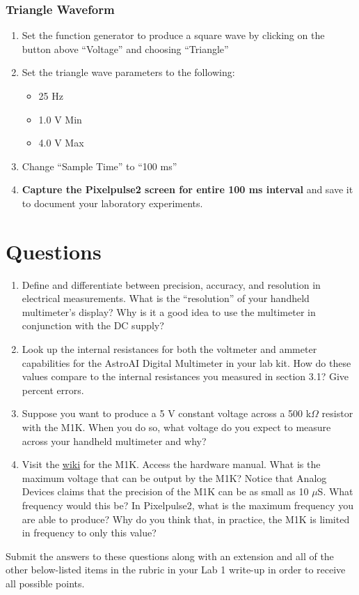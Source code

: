 \documentclass[12pt]{../manual}
\begin{document}
\subsubsection{Triangle Waveform}
\begin{enumerate}
\item Set the function generator to produce a square wave by clicking on the button above ``Voltage'' and choosing ``Triangle''
\item Set the triangle wave parameters to the following: 
\begin{itemize}
\item 25 Hz
\item 1.0 V Min
\item 4.0 V Max
\end{itemize}
\item Change ``Sample Time'' to ``100 ms''
\item \textbf{Capture the Pixelpulse2 screen for entire 100 ms interval} and save it to document your laboratory experiments.
\end{enumerate}

\newpage
\section{Questions}
\begin{enumerate}
\item Define and differentiate between precision, accuracy, and resolution in electrical measurements. What is the ``resolution'' of your handheld multimeter's display? Why is it a good idea to use the multimeter in conjunction with the DC supply?
\item Look up the internal resistances for both the voltmeter and ammeter capabilities for the AstroAI Digital Multimeter in your lab kit. How do these values compare to the internal resistances you measured in section 3.1? Give percent errors.
\item Suppose you want to produce a 5 V constant voltage across a 500 k$\Omega$ resistor with the M1K. When you do so, what voltage do you expect to measure across your handheld multimeter and why? 
\item Visit the \href{https://wiki.analog.com/university/tools/m1k}{wiki} for the M1K. Access the hardware manual. What is the maximum voltage that can be output by the M1K? Notice that Analog Devices claims that the precision of the M1K can be as small as 10 $\mu$S. What frequency would this be? In Pixelpulse2, what is the maximum frequency you are able to produce? Why do you think that, in practice, the M1K is limited in frequency to only this value?
\end{enumerate}
Submit the answers to these questions along with an extension and all of the other below-listed items in the rubric in your Lab 1 write-up in order to receive all possible points. 
\end{document}
